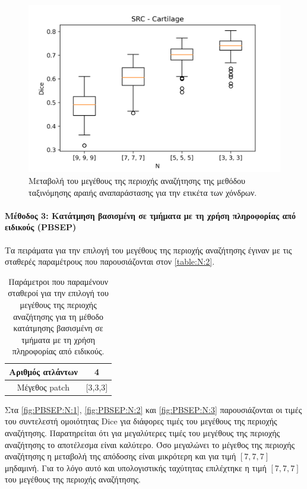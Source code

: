 \documentclass[a4paper,12pt]{article}
\newcommand{\paragraphLine}[1]{\paragraph{#1}\mbox{}}
\begin{document}
\begin{figure}[H]
    \centering
    \includegraphics[width=0.85\linewidth]{SRC_N_Cartilage_plot.png}
    \caption{Μεταβολή του μεγέθους της περιοχής αναζήτησης της μεθόδου
             ταξινόμησης αραιής αναπαράστασης για την ετικέτα των χόνδρων.}
    \label{fig:SRC:N:3}
\end{figure}

\paragraphLine{Μέθοδος 3: Κατάτμηση βασισμένη σε τμήματα με τη χρήση πληροφορίας από
               ειδικούς (PBSEP)}

Τα πειράματα για την επιλογή του μεγέθους της περιοχής αναζήτησης έγιναν με τις
σταθερές παραμέτρους που παρουσιάζονται στον \autoref{table:N:2}.

\begin{table}[h!]
    \centering
    \begin{tabular}{|c|c|} 
        \hline
        Αριθμός ατλάντων & 4 \\ 
        \hline
        Μέγεθος patch & [3,3,3] \\ 
        \hline
    \end{tabular}
    \caption{Παράμετροι που παραμένουν σταθεροί για την επιλογή του μεγέθους της
             περιοχής αναζήτησης για τη μέθοδο κατάτμησης βασισμένη σε τμήματα
             με τη χρήση πληροφορίας από ειδικούς.}
    \label{table:N:2}
\end{table}

Στα \autoref{fig:PBSEP:N:1}, \autoref{fig:PBSEP:N:2} και \autoref{fig:PBSEP:N:3}
παρουσιάζονται οι τιμές του συντελεστή ομοιότητας Dice για διάφορες τιμές του
μεγέθους της περιοχής αναζήτησης. Παρατηρείται ότι για μεγαλύτερες τιμές του
μεγέθους της περιοχής αναζήτησης το αποτέλεσμα είναι καλύτερο. Όσο μεγαλώνει το
μέγεθος της περιοχής αναζήτησης η μεταβολή της απόδοσης είναι μικρότερη και για
τιμή $[7,7,7]$ μηδαμινή. Για το λόγο αυτό και υπολογιστικής ταχύτητας επιλέχτηκε
η τιμή $[7,7,7]$ του μεγέθους της περιοχής αναζήτησης.
\end{document}
